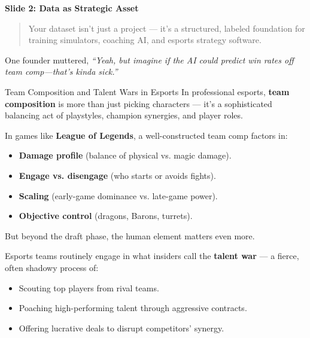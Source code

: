 \textbf{Slide 2: Data as Strategic Asset} 

\begin{quote}
Your dataset isn’t just a project — it’s a structured, labeled foundation for training simulators, coaching AI, and esports strategy software.
\end{quote}
    
    One founder muttered, \textit{``Yeah, but imagine if the AI could predict win rates off team comp—that’s kinda sick.''}

    \begin{HistoricalSidebar}{Team Composition and Talent Wars in Esports}
        In professional esports, \textbf{team composition} is more than just picking characters — it’s a sophisticated balancing act of playstyles, champion synergies, and player roles.

        \medskip
        
        In games like \textbf{League of Legends}, a well-constructed team comp factors in:

        \medskip

        \begin{itemize}
            \item \textbf{Damage profile} (balance of physical vs. magic damage).
            \item \textbf{Engage vs. disengage} (who starts or avoids fights).
            \item \textbf{Scaling} (early-game dominance vs. late-game power).
            \item \textbf{Objective control} (dragons, Barons, turrets).
        \end{itemize}

        \medskip
        
        But beyond the draft phase, the human element matters even more.
        
        \medskip
        
        Esports teams routinely engage in what insiders call the \textbf{talent war} — a fierce, often shadowy process of:

        \medskip

        \begin{itemize}
            \item Scouting top players from rival teams.
            \item Poaching high-performing talent through aggressive contracts.
            \item Offering lucrative deals to disrupt competitors’ synergy.
        \end{itemize}


\end{HistoricalSidebar}
